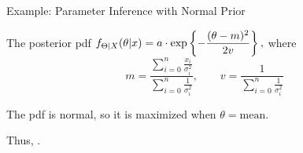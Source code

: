 \begin{frame}{Example: Parameter Inference with Normal Prior}

\hfill {}

\plitemsep 0.05in
\bci

\item<1-> The posterior pdf $\displaystyle f_{\Theta|X}(\theta|x) = a \cdot \exp \left\{ -
    \frac{(\theta - m)^2}{2 v}  \right\},$ where
  $$
  m = \frac
  {\sum_{i=0}^n \frac{x_i}{\sigma_i^2}}
  {\sum_{i=0}^n \frac{1}{\sigma_i^2}}, \qquad v =
  \frac{1}{\sum_{i=0}^n \frac{1}{\sigma_i^2}}
  $$


\item<2-> The pdf is normal, so it is maximized when $\theta =
  \text{mean}.$

\item<3-> Thus, .

  \eci

\end{frame}










